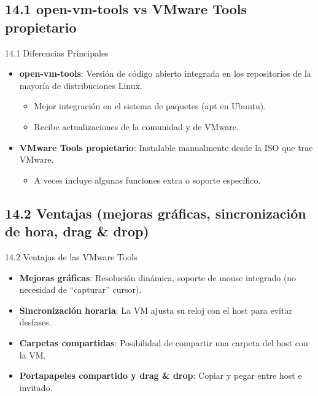 \documentclass{beamer}
\begin{document}
\subsection{14.1 open-vm-tools vs VMware Tools propietario}
\begin{frame}{14.1 Diferencias Principales}
	\begin{itemize}
		\item \textbf{open-vm-tools}: Versión de código abierto integrada en los repositorios de la mayoría de distribuciones Linux.
			\begin{itemize}
				\item Mejor integración en el sistema de paquetes (apt en Ubuntu).
				\item Recibe actualizaciones de la comunidad y de VMware.
			\end{itemize}
		\item \textbf{VMware Tools propietario}: Instalable manualmente desde la ISO que trae VMware.
			\begin{itemize}
				\item A veces incluye algunas funciones extra o soporte específico.
			\end{itemize}
	\end{itemize}
\end{frame}

\subsection{14.2 Ventajas (mejoras gráficas, sincronización de hora, drag \& drop)}
\begin{frame}{14.2 Ventajas de las VMware Tools}
	\begin{itemize}
		\item \textbf{Mejoras gráficas}: Resolución dinámica, soporte de mouse integrado (no necesidad de “capturar” cursor).
		\item \textbf{Sincronización horaria}: La VM ajusta su reloj con el host para evitar desfases.
		\item \textbf{Carpetas compartidas}: Posibilidad de compartir una carpeta del host con la VM.
		\item \textbf{Portapapeles compartido y drag \& drop}: Copiar y pegar entre host e invitado.
	\end{itemize}
\end{frame}

\end{document}
